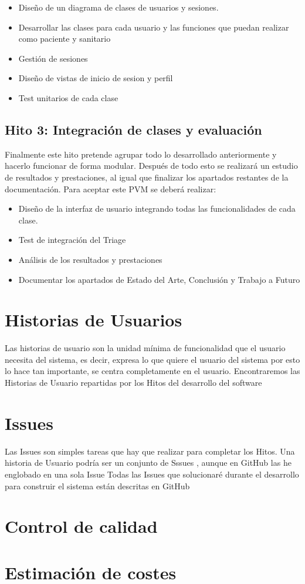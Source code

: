 \begin{itemize}
    \item{Diseño de un diagrama de clases de usuarios y sesiones.}
    \item{Desarrollar las clases para cada usuario y las funciones que puedan realizar como paciente y sanitario}
    \item{Gestión de sesiones}
    \item{Diseño de vistas de inicio de sesion y perfil}
    \item{Test unitarios de cada clase}    
\end{itemize}

\subsection*{Hito 3: Integración de clases y evaluación}

Finalmente este hito pretende agrupar todo lo desarrollado anteriormente y hacerlo funcionar de forma modular. 
Después de todo esto se realizará un estudio de resultados y prestaciones, al igual que finalizar los apartados 
restantes de la documentación. 
Para aceptar este PVM se deberá realizar: 

\begin{itemize}
    \item{Diseño de la interfaz de usuario integrando todas las funcionalidades de cada clase.}
    \item{Test de integración del Triage}
    \item{Análisis de los resultados y prestaciones}
    \item{Documentar los apartados de Estado del Arte, Conclusión y Trabajo a Futuro}
\end{itemize}

\section{Historias de Usuarios}
Las historias de usuario son la unidad mínima de funcionalidad que el usuario necesita del sistema, es decir, 
expresa lo que quiere el usuario del sistema por esto lo hace tan importante, se centra completamente en el 
usuario. Encontraremos las Historias de Usuario repartidas por los Hitos del desarrollo del software 

\section{Issues}
Las Issues son simples tareas que hay que realizar para completar los Hitos. 
Una historia de Usuario podría ser un conjunto de Sssues , aunque en GitHub las he englobado en una sola Issue
Todas las Issues que solucionaré durante el desarrollo para construir el sistema están descritas en GitHub 


\section{Control de calidad}



\section{Estimación de costes}
